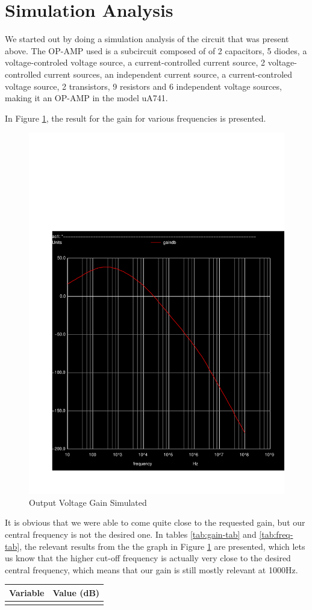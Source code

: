 \clearpage

\section{Simulation Analysis}
\label{sec:simulation}

We started out by doing a simulation analysis of the circuit that was present above. The OP-AMP used is a subcircuit composed of of 2 capacitors, 5 diodes, a voltage-controled voltage source, a current-controlled current source, 2 voltage-controlled current sources, an independent current source, a current-controled voltage source, 2 transistors, 9 resistors and 6 independent voltage sources, making it an OP-AMP in the model uA741.

In Figure \ref{fig:sim-gain}, the result for the gain for various frequencies is presented.

\begin{figure}[H] \centering
\includegraphics[width=0.5\linewidth]{../sim/gain.pdf}
\caption{Output Voltage Gain Simulated}
\label{fig:sim-gain}
\end{figure}

It is obvious that we were able to come quite close to the requested gain, but our central frequency is not the desired one. In tables \ref{tab:gain-tab} and \ref{tab:freq-tab}, the relevant results from the the graph in Figure \ref{fig:sim-gain} are presented, which lets us know that the higher cut-off frequency is actually very close to the desired central frequency, which means that our gain is still mostly relevant at 1000Hz.

\begin{center}
\begin{tabular}{|l|r|}
  \hline    
  {\bf Variable} & {\bf Value (dB)} \\ \hline
  
  \label{tab:gain-tab}
\end{tabular}
\end{center}

